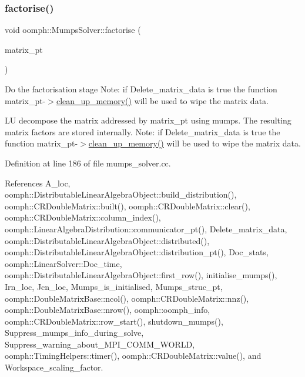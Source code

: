 \subsubsection{\texorpdfstring{factorise()}{factorise()}}
{\footnotesize\ttfamily void oomph\+::\+Mumps\+Solver\+::factorise (\begin{DoxyParamCaption}\item[{\hyperlink{classoomph_1_1DoubleMatrixBase}{Double\+Matrix\+Base} $\ast$const \&}]{matrix\+\_\+pt }\end{DoxyParamCaption})}



Do the factorisation stage Note\+: if Delete\+\_\+matrix\+\_\+data is true the function matrix\+\_\+pt-\/$>$\hyperlink{classoomph_1_1MumpsSolver_adc1541e4a9cbbe9c641f988380618713}{clean\+\_\+up\+\_\+memory()} will be used to wipe the matrix data. 

LU decompose the matrix addressed by matrix\+\_\+pt using mumps. The resulting matrix factors are stored internally. Note\+: if Delete\+\_\+matrix\+\_\+data is true the function matrix\+\_\+pt-\/$>$\hyperlink{classoomph_1_1MumpsSolver_adc1541e4a9cbbe9c641f988380618713}{clean\+\_\+up\+\_\+memory()} will be used to wipe the matrix data. 

Definition at line 186 of file mumps\+\_\+solver.\+cc.



References A\+\_\+loc, oomph\+::\+Distributable\+Linear\+Algebra\+Object\+::build\+\_\+distribution(), oomph\+::\+C\+R\+Double\+Matrix\+::built(), oomph\+::\+C\+R\+Double\+Matrix\+::clear(), oomph\+::\+C\+R\+Double\+Matrix\+::column\+\_\+index(), oomph\+::\+Linear\+Algebra\+Distribution\+::communicator\+\_\+pt(), Delete\+\_\+matrix\+\_\+data, oomph\+::\+Distributable\+Linear\+Algebra\+Object\+::distributed(), oomph\+::\+Distributable\+Linear\+Algebra\+Object\+::distribution\+\_\+pt(), Doc\+\_\+stats, oomph\+::\+Linear\+Solver\+::\+Doc\+\_\+time, oomph\+::\+Distributable\+Linear\+Algebra\+Object\+::first\+\_\+row(), initialise\+\_\+mumps(), Irn\+\_\+loc, Jcn\+\_\+loc, Mumps\+\_\+is\+\_\+initialised, Mumps\+\_\+struc\+\_\+pt, oomph\+::\+Double\+Matrix\+Base\+::ncol(), oomph\+::\+C\+R\+Double\+Matrix\+::nnz(), oomph\+::\+Double\+Matrix\+Base\+::nrow(), oomph\+::oomph\+\_\+info, oomph\+::\+C\+R\+Double\+Matrix\+::row\+\_\+start(), shutdown\+\_\+mumps(), Suppress\+\_\+mumps\+\_\+info\+\_\+during\+\_\+solve, Suppress\+\_\+warning\+\_\+about\+\_\+\+M\+P\+I\+\_\+\+C\+O\+M\+M\+\_\+\+W\+O\+R\+LD, oomph\+::\+Timing\+Helpers\+::timer(), oomph\+::\+C\+R\+Double\+Matrix\+::value(), and Workspace\+\_\+scaling\+\_\+factor.



